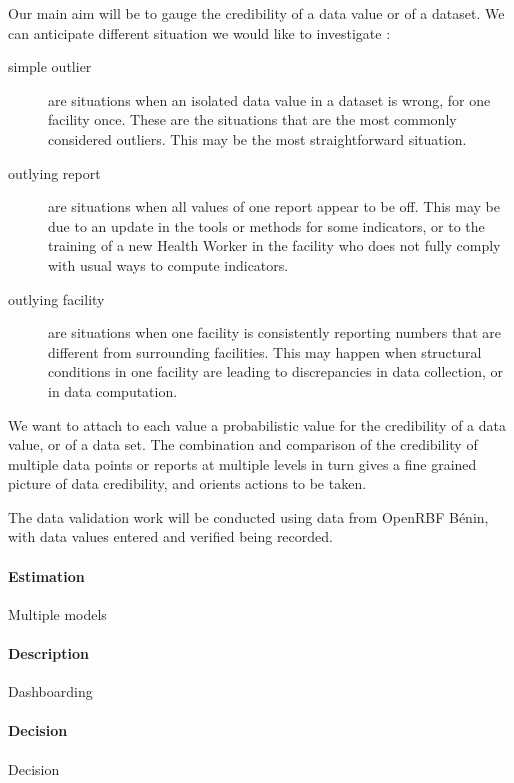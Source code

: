 \documentclass[a4paper,11pt,final,twoside]{article}
\begin{document}
Our main aim will be to gauge the credibility of a data value or of a dataset.  We can anticipate different situation we would like to investigate :
\begin{description}
\item[simple outlier] are situations when an isolated data value in a dataset is wrong, for one facility once. These are the situations that are the most commonly considered outliers. This may be the most straightforward situation.
\item[outlying report] are situations when all values of one report appear to be off. This may be due to an update in the tools or methods for some indicators, or to the training of a new Health Worker in the facility who does not fully comply with usual ways to compute indicators.
\item[outlying facility] are situations when one facility is consistently reporting numbers that are different from surrounding facilities. This may happen when structural conditions in one facility are leading to discrepancies in data collection, or in data computation.
\end{description}

We want to attach to each value a probabilistic value for the credibility of a data value, or of a data set. The combination and comparison of the credibility of multiple data points or reports at multiple levels in turn gives a fine grained picture of data credibility, and orients actions to be taken.


The data validation work will be conducted using data from OpenRBF Bénin, with data values entered and verified being recorded.

\paragraph{Estimation} Multiple models

\paragraph{Description} Dashboarding

\paragraph{Decision} Decision
\end{document}
